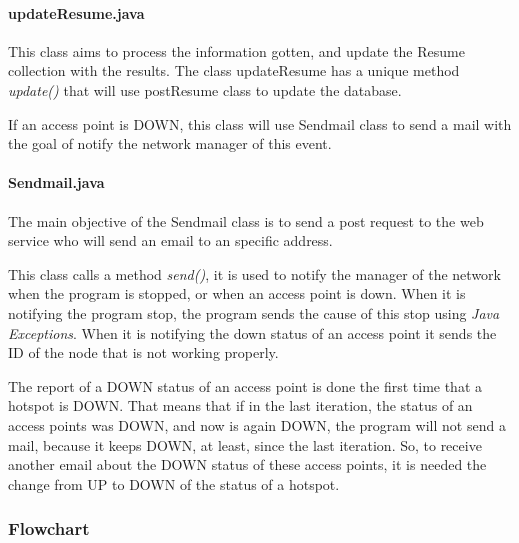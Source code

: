 \documentclass[12pt, a4paper,twoside]{tesi_upf}
\begin{document}
                \paragraph{updateResume.java}
                This class aims to process the information gotten, and update the Resume collection with the results. The class updateResume has a unique method \textit{update()} that will use postResume class to update the database.
                
                If an access point is DOWN, this class will use Sendmail class to send a mail with the goal of notify the network manager of this event.\\
                
                 \paragraph{Sendmail.java}
                 The main objective of the Sendmail class is to send a post request to the web service who will send an email to an specific address.
                 
                 This class calls a method \textit{send()}, it is used to notify the manager of the network when the program is stopped, or when an access point is down.
                 When it is notifying the program stop, the program sends the cause of this stop using \textit{Java Exceptions}.
                 When it is notifying the down status of an access point it sends the ID of the node that is not working properly.

                 The report of a DOWN status of an access point is done the first time that a hotspot is DOWN. That means that if in the last iteration, the status of an access points was DOWN, and now is again DOWN, the program will not send a mail, because it keeps DOWN, at least, since the last iteration.
                So, to receive another email about the DOWN status of these access points, it is needed the change from UP to DOWN of the status of a hotspot.
                 
        
            \subsubsection{Flowchart}
            
\end{document}

